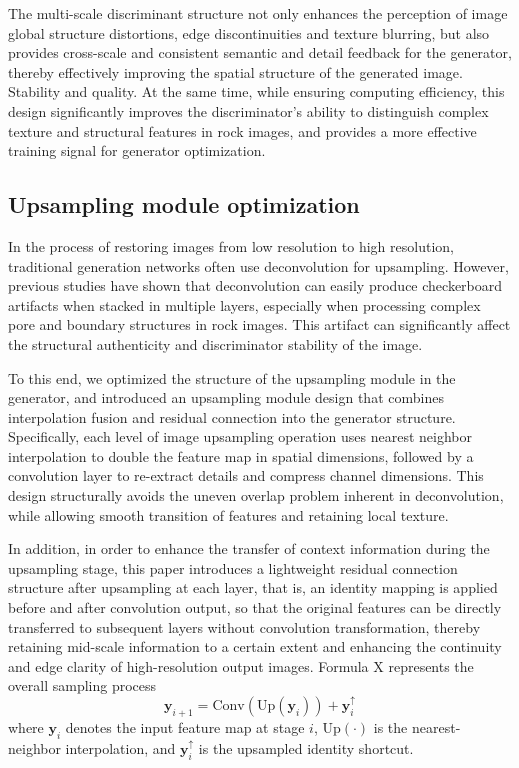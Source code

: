 \documentclass[a4paper,fleqn]{cas-sc}
\begin{document}
The multi-scale discriminant structure not only enhances the perception of image global structure distortions, edge discontinuities and texture blurring, but also provides cross-scale and consistent semantic and detail feedback for the generator, thereby effectively improving the spatial structure of the generated image. Stability and quality. At the same time, while ensuring computing efficiency, this design significantly improves the discriminator's ability to distinguish complex texture and structural features in rock images, and provides a more effective training signal for generator optimization. 
\subsection{Upsampling module optimization}
In the process of restoring images from low resolution to high resolution, traditional generation networks often use deconvolution for upsampling. However, previous studies have shown that deconvolution can easily produce checkerboard artifacts when stacked in multiple layers, especially when processing complex pore and boundary structures in rock images. This artifact can significantly affect the structural authenticity and discriminator stability of the image.

To this end, we optimized the structure of the upsampling module in the generator, and introduced an upsampling module design that combines interpolation fusion and residual connection into the generator structure. Specifically, each level of image upsampling operation uses nearest neighbor interpolation to double the feature map in spatial dimensions, followed by a convolution layer to re-extract details and compress channel dimensions. This design structurally avoids the uneven overlap problem inherent in deconvolution, while allowing smooth transition of features and retaining local texture.

In addition, in order to enhance the transfer of context information during the upsampling stage, this paper introduces a lightweight residual connection structure after upsampling at each layer, that is, an identity mapping is applied before and after convolution output, so that the original features can be directly transferred to subsequent layers without convolution transformation, thereby retaining mid-scale information to a certain extent and enhancing the continuity and edge clarity of high-resolution output images.
Formula X represents the overall sampling process 
\begin{equation}
	\mathbf{y}_{i+1} = \mathrm{Conv}\left( \mathrm{Up}(\mathbf{y}_i) \right) + \mathbf{y}_{i}^{\uparrow}
\end{equation}
where $\mathbf{y}_i$ denotes the input feature map at stage $i$, $\mathrm{Up}(\cdot)$ is the nearest-neighbor interpolation, and $\mathbf{y}_{i}^{\uparrow}$ is the upsampled identity shortcut.
\end{document}
